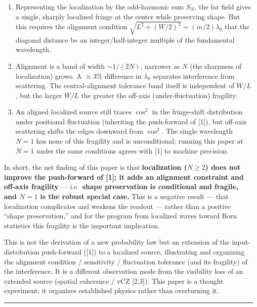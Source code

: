 \documentclass[
]{article}
\newcounter{none} %
\providecommand{\tightlist}{%
  \setlength{\itemsep}{0pt}\setlength{\parskip}{0pt}}
\begin{document}
\begin{enumerate}
\def\labelenumi{\arabic{enumi}.}
\tightlist
\item
  Representing the localization by the odd-harmonic sum \(S_N\), the far
  field gives a single, sharply localized fringe at the center while
  preserving shape. But this requires the alignment condition
  \(\sqrt{L^2+(W/2)^2}=(m/2)\lambda_0\) that the diagonal distance be an
  integer/half-integer multiple of the fundamental wavelength.
\item
  Alignment is a band of width \(\sim1/(2N)\), narrower as \(N\) (the
  sharpness of localization) grows. A \(\approx3\%\) difference in
  \(\lambda_0\) separates interference from scattering. The
  central-alignment tolerance band itself is independent of \(W/L\), but
  the larger \(W/L\) the greater the off-axis (under-fluctuation)
  fragility.
\item
  An aligned localized source still traces \(\cos^2\) in the
  fringe-shift distribution under positional fluctuation (inheriting the
  push-forward of {[}1{]}), but off-axis scattering shifts the edges
  downward from \(\cos^2\). The single wavelength \(N=1\) has none of
  this fragility and is unconditional; running this paper at \(N=1\)
  under the same conditions agrees with {[}1{]} to machine precision.
\end{enumerate}

In short, the net finding of this paper is that \textbf{localization
(\(N\ge2\)) does not improve the push-forward of {[}1{]}; it adds an
alignment constraint and off-axis fragility} --- i.e.~\textbf{shape
preservation is conditional and fragile, and \(N=1\) is the robust
special case.} This is a negative result --- that localization
complicates and weakens the readout --- rather than a positive ``shape
preservation,'' and for the program from localized waves toward Born
statistics this fragility is the important implication.

This is not the derivation of a new probability law but an extension of
the input-distribution push-forward ({[}1{]}) to a localized source,
illustrating and organizing the alignment condition / sensitivity /
fluctuation tolerance (and its fragility) of the interference. It is a
different observation mode from the visibility loss of an extended
source (spatial coherence / vCZ {[}2,3{]}). This paper is a thought
experiment; it organizes established physics rather than overturning it.

\begin{center}\rule{0.5\linewidth}{0.5pt}\end{center}
\end{document}
